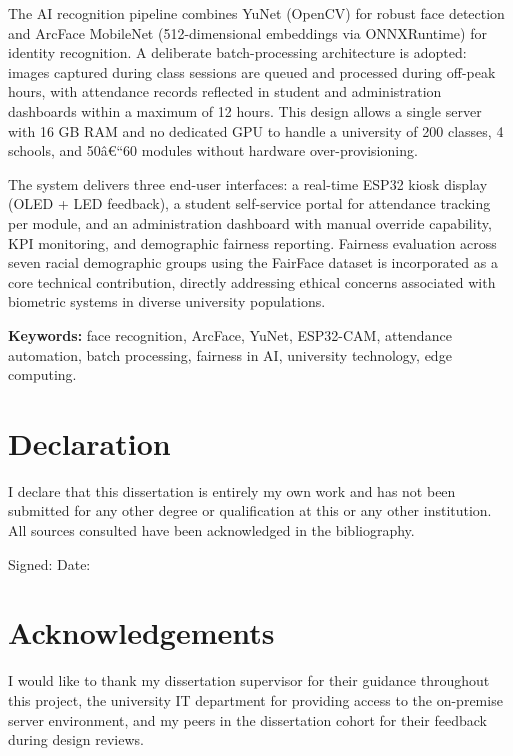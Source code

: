\documentclass[12pt,a4paper]{report}
\begin{document}
The AI recognition pipeline combines YuNet (OpenCV) for robust face detection and ArcFace MobileNet (512-dimensional embeddings via ONNXRuntime) for identity recognition. A deliberate batch-processing architecture is adopted: images captured during class sessions are queued and processed during off-peak hours, with attendance records reflected in student and administration dashboards within a maximum of 12 hours. This design allows a single server with 16 GB RAM and no dedicated GPU to handle a university of 200 classes, 4 schools, and 50â€“60 modules without hardware over-provisioning.

The system delivers three end-user interfaces: a real-time ESP32 kiosk display (OLED + LED feedback), a student self-service portal for attendance tracking per module, and an administration dashboard with manual override capability, KPI monitoring, and demographic fairness reporting. Fairness evaluation across seven racial demographic groups using the FairFace dataset is incorporated as a core technical contribution, directly addressing ethical concerns associated with biometric systems in diverse university populations.

\textbf{Keywords:} face recognition, ArcFace, YuNet, ESP32-CAM, attendance automation, batch processing, fairness in AI, university technology, edge computing.

\chapter*{Declaration}
I declare that this dissertation is entirely my own work and has not been submitted for any other degree or qualification at this or any other institution. All sources consulted have been acknowledged in the bibliography.

\vspace{2cm}
\noindent Signed: \underline{\hspace{6cm}} \hfill Date: \underline{\hspace{3cm}}

\chapter*{Acknowledgements}
I would like to thank my dissertation supervisor for their guidance throughout this project, the university IT department for providing access to the on-premise server environment, and my peers in the dissertation cohort for their feedback during design reviews.
\end{document}

